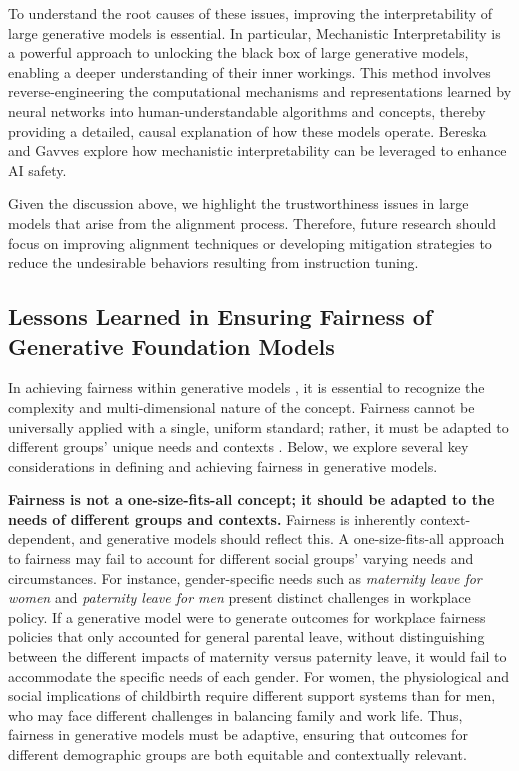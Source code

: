 To understand the root causes of these issues, improving the interpretability of large generative models \cite{singh2024rethinking} is essential. In particular, Mechanistic Interpretability \cite{nanda2023progress, conmy2023towards, zimmermann2024scale, rai2024practical} is a powerful approach to unlocking the black box of large generative models, enabling a deeper understanding of their inner workings. This method involves reverse-engineering the computational mechanisms and representations learned by neural networks into human-understandable algorithms and concepts, thereby providing a detailed, causal explanation of how these models operate. Bereska and Gavves \cite{bereska2024mechanistic} explore how mechanistic interpretability can be leveraged to enhance AI safety.

Given the discussion above, we highlight the trustworthiness issues in large models that arise from the alignment process. Therefore, future research should focus on improving alignment techniques or developing mitigation strategies to reduce the undesirable behaviors resulting from instruction tuning.

\subsection{Lessons Learned in Ensuring Fairness of Generative Foundation Models}

In achieving fairness within generative models \cite{gallegos2024biassurvey, 10.1145/3682112.3682117, openai_2024_democratic}, it is essential to recognize the complexity and multi-dimensional nature of the concept. Fairness cannot be universally applied with a single, uniform standard; rather, it must be adapted to different groups' unique needs and contexts \cite{lee2019context}. Below, we explore several key considerations in defining and achieving fairness in generative models.

\textbf{Fairness is not a one-size-fits-all concept; it should be adapted to the needs of different groups and contexts.}
Fairness is inherently context-dependent, and generative models should reflect this. A one-size-fits-all approach to fairness may fail to account for different social groups' varying needs and circumstances. For instance, gender-specific needs such as \textit{maternity leave for women} and \textit{paternity leave for men} present distinct challenges in workplace policy. If a generative model were to generate outcomes for workplace fairness policies that only accounted for general parental leave, without distinguishing between the different impacts of maternity versus paternity leave, it would fail to accommodate the specific needs of each gender. For women, the physiological and social implications of childbirth require different support systems than for men, who may face different challenges in balancing family and work life. Thus, fairness in generative models must be adaptive, ensuring that outcomes for different demographic groups are both equitable and contextually relevant.

